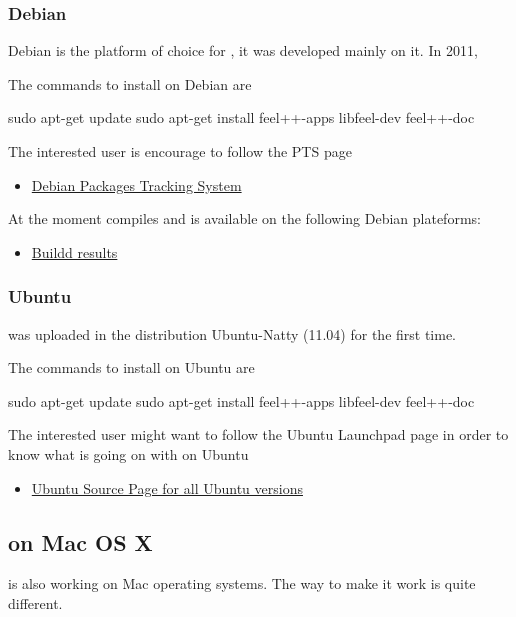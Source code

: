 \subsubsection{Debian}

Debian is the platform of choice for \feel, it was developed mainly on it. In
2011,

The commands to install \feel on Debian are
\begin{unixcom}
  sudo apt-get update
  sudo apt-get install feel++-apps libfeel-dev feel++-doc
\end{unixcom}


The interested user is encourage to follow the \feel PTS page
\begin{itemize}
\item \feel \href{http://packages.qa.debian.org/f/feel%2B%2B.html}{Debian Packages Tracking System}
\end{itemize}

At the moment \feel compiles and is available on the following Debian
plateforms:
\begin{itemize}
\item \feel \href{https://buildd.debian.org/status/package.php?p=feel%2b%2b}{Buildd results}
\end{itemize}

\subsubsection{Ubuntu}

\feel was uploaded in the distribution Ubuntu-Natty (11.04) for the first
time.

The commands to install \feel on Ubuntu are
\begin{unixcom}
  sudo apt-get update
  sudo apt-get install feel++-apps libfeel-dev feel++-doc
\end{unixcom}

The interested user might want to follow the Ubuntu Launchpad \feel page in
order to know what is going on with \feel on Ubuntu
\begin{itemize}
\item \feel \href{https://launchpad.net/ubuntu/+source/feel++}{Ubuntu Source
  Page for all Ubuntu versions}
\end{itemize}


\subsection{\Feel on Mac OS X}
\label{macosx}
\feel is also working on Mac operating systems. The way to make it work is quite different.

